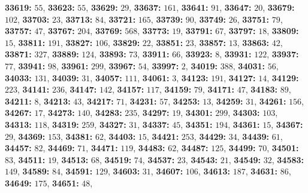 \textsf{\bfseries 33619:} $55$, \textsf{\bfseries 33623:} $55$, \textsf{\bfseries 33629:} $29$, \textsf{\bfseries 33637:} $161$, \textsf{\bfseries 33641:} $91$, \textsf{\bfseries 33647:} $20$, \textsf{\bfseries 33679:} $102$, \textsf{\bfseries 33703:} $23$, \textsf{\bfseries 33713:} $84$, \textsf{\bfseries 33721:} $165$, \textsf{\bfseries 33739:} $90$, \textsf{\bfseries 33749:} $26$, \textsf{\bfseries 33751:} $79$, \textsf{\bfseries 33757:} $47$, \textsf{\bfseries 33767:} $204$, \textsf{\bfseries 33769:} $568$, \textsf{\bfseries 33773:} $19$, \textsf{\bfseries 33791:} $67$, \textsf{\bfseries 33797:} $18$, \textsf{\bfseries 33809:} $15$, \textsf{\bfseries 33811:} $191$, \textsf{\bfseries 33827:} $106$, \textsf{\bfseries 33829:} $22$, \textsf{\bfseries 33851:} $23$, \textsf{\bfseries 33857:} $13$, \textsf{\bfseries 33863:} $42$, \textsf{\bfseries 33871:} $327$, \textsf{\bfseries 33889:} $124$, \textsf{\bfseries 33893:} $73$, \textsf{\bfseries 33911:} $66$, \textsf{\bfseries 33923:} $8$, \textsf{\bfseries 33931:} $122$, \textsf{\bfseries 33937:} $77$, \textsf{\bfseries 33941:} $98$, \textsf{\bfseries 33961:} $299$, \textsf{\bfseries 33967:} $54$, \textsf{\bfseries 33997:} $2$, \textsf{\bfseries 34019:} $388$, \textsf{\bfseries 34031:} $56$, \textsf{\bfseries 34033:} $131$, \textsf{\bfseries 34039:} $31$, \textsf{\bfseries 34057:} $111$, \textsf{\bfseries 34061:} $3$, \textsf{\bfseries 34123:} $191$, \textsf{\bfseries 34127:} $14$, \textsf{\bfseries 34129:} $223$, \textsf{\bfseries 34141:} $236$, \textsf{\bfseries 34147:} $142$, \textsf{\bfseries 34157:} $117$, \textsf{\bfseries 34159:} $79$, \textsf{\bfseries 34171:} $47$, \textsf{\bfseries 34183:} $89$, \textsf{\bfseries 34211:} $8$, \textsf{\bfseries 34213:} $43$, \textsf{\bfseries 34217:} $71$, \textsf{\bfseries 34231:} $57$, \textsf{\bfseries 34253:} $13$, \textsf{\bfseries 34259:} $31$, \textsf{\bfseries 34261:} $156$, \textsf{\bfseries 34267:} $17$, \textsf{\bfseries 34273:} $140$, \textsf{\bfseries 34283:} $235$, \textsf{\bfseries 34297:} $19$, \textsf{\bfseries 34301:} $299$, \textsf{\bfseries 34303:} $103$, \textsf{\bfseries 34313:} $118$, \textsf{\bfseries 34319:} $259$, \textsf{\bfseries 34327:} $31$, \textsf{\bfseries 34337:} $45$, \textsf{\bfseries 34351:} $194$, \textsf{\bfseries 34361:} $15$, \textsf{\bfseries 34367:} $29$, \textsf{\bfseries 34369:} $153$, \textsf{\bfseries 34381:} $62$, \textsf{\bfseries 34403:} $15$, \textsf{\bfseries 34421:} $253$, \textsf{\bfseries 34429:} $34$, \textsf{\bfseries 34439:} $61$, \textsf{\bfseries 34457:} $82$, \textsf{\bfseries 34469:} $71$, \textsf{\bfseries 34471:} $119$, \textsf{\bfseries 34483:} $62$, \textsf{\bfseries 34487:} $125$, \textsf{\bfseries 34499:} $70$, \textsf{\bfseries 34501:} $83$, \textsf{\bfseries 34511:} $19$, \textsf{\bfseries 34513:} $68$, \textsf{\bfseries 34519:} $74$, \textsf{\bfseries 34537:} $23$, \textsf{\bfseries 34543:} $21$, \textsf{\bfseries 34549:} $32$, \textsf{\bfseries 34583:} $149$, \textsf{\bfseries 34589:} $84$, \textsf{\bfseries 34591:} $129$, \textsf{\bfseries 34603:} $31$, \textsf{\bfseries 34607:} $106$, \textsf{\bfseries 34613:} $187$, \textsf{\bfseries 34631:} $86$, \textsf{\bfseries 34649:} $175$, \textsf{\bfseries 34651:} $48$, 
